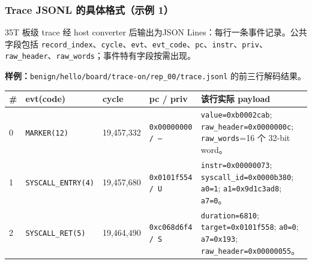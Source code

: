 \documentclass[aspectratio=169,10pt]{beamer}
\begin{document}
\begin{frame}
  \frametitle{Trace JSONL 的具体格式（示例 1）}
  \vskip0.05cm
  \small
  35T 板级 trace 经 host converter 后输出为\alert{JSON Lines}：每行一条事件记录。公共字段包括 \texttt{record\_index}、\texttt{cycle}、\texttt{evt}、\texttt{evt\_code}、\texttt{pc}、\texttt{instr}、\texttt{priv}、\texttt{raw\_header}、\texttt{raw\_words}；事件特有字段按需出现。

  \vskip0.12cm
  {\scriptsize\textbf{样例：}\texttt{benign/hello/board/trace-on/rep\_00/trace.jsonl} 的前三行解码结果。}
  \vskip0.08cm
  \begin{center}\tiny
  \renewcommand{\arraystretch}{1.10}
  \setlength{\tabcolsep}{3pt}
  \begin{tabularx}{0.98\linewidth}{@{}L{0.55cm}L{1.75cm}L{1.45cm}L{2.0cm}Y@{}}
    \toprule
    \textbf{\#} & \textbf{evt(code)} & \textbf{cycle} & \textbf{pc / priv} & \textbf{该行实际 payload} \\
     & \texttt{MARKER(12)} & 19,457,332 & \texttt{0x00000000 / --} & \texttt{value=0xb0002cab}; \texttt{raw\_header=0x0000000c}; \texttt{raw\_words}=16 个 32-bit word。 \\
    1 & \texttt{SYSCALL\_ENTRY(4)} & 19,457,680 & \texttt{0x0101f554 / U} & \texttt{instr=0x00000073}; \texttt{syscall\_id=0x0000b380}; \texttt{a0=1}; \texttt{a1=0x9d1c3ad8}; \texttt{a7=0}。 \\
    2 & \texttt{SYSCALL\_RET(5)} & 19,464,490 & \texttt{0xc068d6f4 / S} & \texttt{duration=6810}; \texttt{target=0x0101f558}; \texttt{a0=0}; \texttt{a7=0x193}; \texttt{raw\_header=0x00000055}。 \\
    \bottomrule
  \end{tabularx}
  \end{center}

  \vskip0.06cm
\end{frame}
\end{document}
